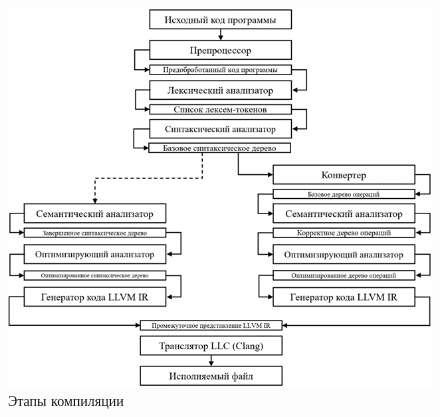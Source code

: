 \newpage
\begin{figure}[h]
    \centering
    \includegraphics[width=\textwidth]{images/compilation-pipeline.png}
    \caption{Этапы компиляции}
    \label{fig:compilation_pipeline}
\end{figure}
